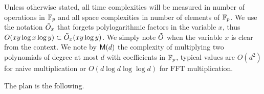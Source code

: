 Unless otherwise stated, all time complexities will be measured in
number of operations in $\mathbb{F}_p$ and all space complexities in number of
elements of $\mathbb{F}_p$. We use the notation $\tilde{O}_x$ that forgets
polylogarithmic factors in the variable $x$, thus $O(xy\log x \log
y)\subset\tilde{O}_x(xy\log y)$. We simply note $\tilde{O}$ when the
variable $x$ is clear from the context. We note by $\mathrm{\sf M}(d)$ the
complexity of multiplying two polynomials of degree at most $d$ with
coefficients in $\mathbb{F}_p$, typical values are $O(d^2)$ for naive
multiplication or $O(d\log d\log\log d)$ for FFT multiplication.

The plan is the following.



%
